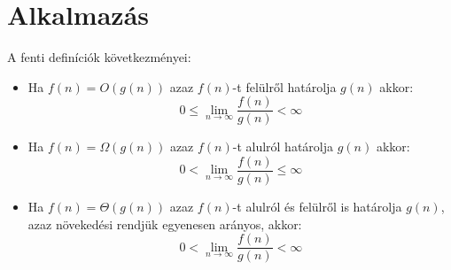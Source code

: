 \documentclass{article}
\theoremstyle{mytheoremstyle}
\theoremstyle{mytheoremstyle}
\theoremstyle{myproblemstyle}
\begin{document}

\section{Alkalmazás}
A fenti definíciók következményei:
\begin{itemize}
    \item 
    Ha $f(n) = O(g(n))$ azaz $f(n)$-t felülről határolja $g(n)$ akkor:
    \[0\leq \lim_{n\to\infty}\frac{f(n)}{g(n)}<\infty\]
    \item 
    Ha $f(n) = \Omega(g(n))$ azaz $f(n)$-t alulról határolja $g(n)$ akkor:
    \[0<\lim_{n\to\infty}\frac{f(n)}{g(n)}\leq \infty\]
    \item 
    Ha $f(n) = \Theta(g(n))$ azaz $f(n)$-t alulról és felülről is határolja $g(n)$, 
    azaz növekedési rendjük egyenesen arányos, akkor:
    \[0<\lim_{n\to\infty}\frac{f(n)}{g(n)}<\infty\]
\end{itemize}
\end{document}
